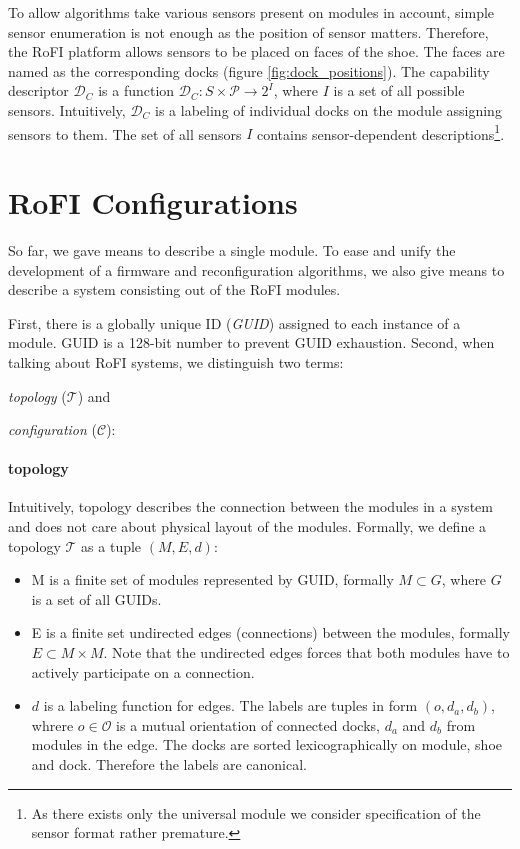 To allow algorithms take various sensors present on modules in account, simple
sensor enumeration is not enough as the position of sensor matters. Therefore,
the RoFI platform allows sensors to be placed on faces of the shoe. The faces
are named as the corresponding docks (figure \ref{fig:dock_positions}). The
capability descriptor $\mathcal{D}_C$ is a function $\mathcal{D}_C:
S\times\mathcal{P} \rightarrow 2^{I}$, where $I$ is a set of all possible
sensors. Intuitively, $\mathcal{D}_C$ is a labeling of individual docks on the
module assigning sensors to them. The set of all sensors $I$ contains
sensor-dependent descriptions\footnote{As there exists only the universal module
we consider specification of the sensor format rather premature.}.

\section{RoFI Configurations} \label{sec:configuration}

So far, we gave means to describe a single module. To ease and unify the
development of a firmware and reconfiguration algorithms, we also give means to
describe a system consisting out of the RoFI modules.

First, there is a globally unique ID (\emph{GUID}) assigned to each instance of
a module. GUID is a 128-bit number to prevent GUID exhaustion. Second, when
talking about RoFI systems, we distinguish two terms:
\begin{enumerate*}
    \item \emph{topology} ($\mathcal{T}$) and
    \item \emph{configuration} ($\mathcal{C}$):
\end{enumerate*}

\paragraph{topology} Intuitively, topology describes the connection between the
modules in a system and does not care about physical layout of the modules.
Formally, we define a topology $\mathcal{T}$ as a tuple $(M, E, d)$:
\begin{itemize}
    \item M is a finite set of modules represented by GUID, formally $M\subset
    G$, where $G$ is a set of all GUIDs.
    \item E is a finite set undirected edges (connections) between the modules,
    formally $E\subset M\times M$. Note that the undirected edges forces that
    both modules have to actively participate on a connection.
    \item $d$ is a labeling function for edges. The labels are tuples in form
    $(o, d_a, d_b)$, whrere $o\in\mathcal{O}$ is a mutual orientation of
    connected docks, $d_a$ and $d_b$ from modules in the edge. The docks are
    sorted lexicographically on module, shoe and dock. Therefore the labels are
    canonical.
\end{itemize}

